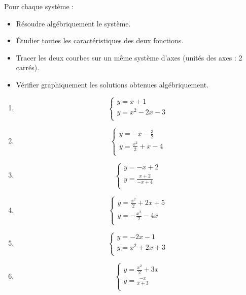 \begin{exercice}
Pour chaque système :
\begin{itemize}
\item Résoudre algébriquement le système.
\item Étudier toutes les caractéristiques des deux fonctions.
\item Tracer les deux courbes sur un même système d’axes (unités des axes : 2 carrés).
\item Vérifier graphiquement les solutions obtenues algébriquement.
\end{itemize}
\begin{enumerate}
\item $$\left\{ \begin{array}{l}
    y=x+1 \\ 
   y={{x}^{2}}-2x-3 \\ 
	\end{array} \right.$$
\item $$\left\{ \begin{array}{l}
    y=-x-\frac{3}{2} \\ 
   y=\frac{{{x}^{2}}}{2}+x-4 \\ 
	\end{array} \right.$$
\item $$\left\{ \begin{array}{l}
    y=-x+2 \\ 
   y=\frac{x+2}{-x+4} \\ 
	\end{array} \right.$$
\item $$\left\{ \begin{array}{l}
    y=\frac{{{x}^{2}}}{2}+2x+5 \\ 
   y=-\frac{{{x}^{2}}}{2}-4x \\ 
	\end{array} \right.$$
\item $$\left\{ \begin{array}{l}
    y=-2x-1 \\ 
   y={{x}^{2}}+2x+3 \\ 
	\end{array} \right.$$
\item $$\left\{ \begin{array}{l}
    y=\frac{{{x}^{2}}}{2}+3x \\ 
   y=\frac{-x}{x+3} \\ 
	\end{array} \right.$$
\end{enumerate}
\end{exercice}

